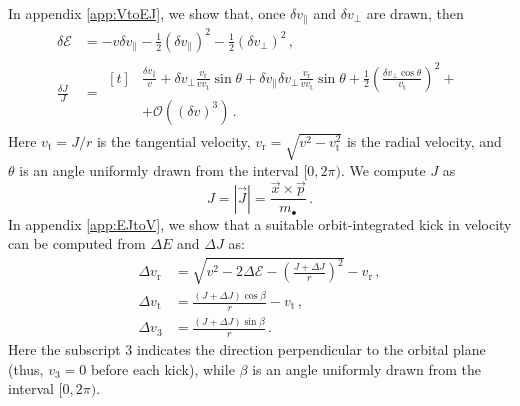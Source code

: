 \documentclass[desactivate]{aa}
\begin{document}
        In appendix \ref{app:VtoEJ}, we show that, once $\delta v_\parallel$ and $\delta v_\perp$ are drawn, then
        \begin{align}
            \delta \mathcal{E} &= -v \delta v_\parallel - \frac{1}{2} \left(\delta v_\parallel\right)^2 - \frac{1}{2} \left(\delta v_\perp\right)^2 \, , \\
            \frac{\delta J}{J} &=
            \begin{aligned}[t]
                 &\frac{\delta v_\parallel}{v} + \delta v_\perp \frac{v_\mathrm{r}}{v v_\mathrm{t}} \sin{\theta} + \delta v_\parallel \delta v_\perp \frac{v_\mathrm{r}}{v v_\mathrm{t}} \sin{\theta} + \frac{1}{2} \left(\frac{\delta v_\perp \cos{\theta}}{v_\mathrm{t}}\right)^2 + \\ &+ \mathcal{O} \left( (\delta v)^3 \right) \, .             
            \end{aligned}
        \end{align}
        Here $v_\mathrm{t} = J/r$ is the tangential velocity, $v_\mathrm{r} = \sqrt{v^2 - v_\mathrm{t}^2}$ is the radial velocity, and $\theta$ is an angle uniformly drawn from the interval $[0, 2 \pi)$. We compute $J$ as
        \begin{equation}
            J = |\vec{J}| = \frac{\vec{x} \times \vec{p}}{m_\bullet} \, .
        \end{equation}
        In appendix \ref{app:EJtoV}, we show that a suitable orbit-integrated kick in velocity can be computed from $\Delta E$ and $\Delta J$ as:
        \begin{align} \label{eq:delta_vr}
            \Delta v_\mathrm{r} &= \sqrt{v^2 - 2 \Delta \mathcal{E} - \left(\frac{J + \Delta J}{r}\right)^2} - v_\mathrm{r} \, , \\
            \Delta v_\mathrm{t} &= \frac{(J + \Delta J) \cos{\beta}}{r} - v_\mathrm{t} \, , \\
            \Delta v_\mathrm{3} &= \frac{(J + \Delta J) \sin{\beta}}{r} \, .
        \end{align}
        Here the subscript 3 indicates the direction perpendicular to the orbital plane (thus, $v_\mathrm{3} = 0$ before each kick), while $\beta$ is an angle uniformly drawn from the interval $[0, 2 \pi)$.
\end{document}
